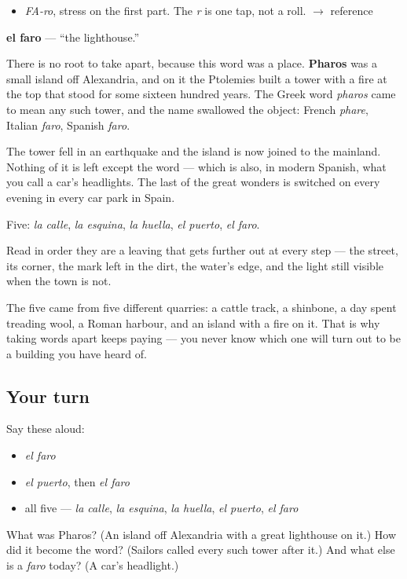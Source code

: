 \begin{sounds}
\begin{itemize}
\raggedright
  \item \emph{FA-ro}, stress on the first part. The \emph{r} is one tap, not a roll. $\to$ reference
\end{itemize}
\end{sounds}

\begin{cousinweb}
\textbf{el faro} — \textquotedblleft{}the lighthouse.\textquotedblright{}

There is no root to take apart, because this word was a place. \textbf{Pharos} was a small island off Alexandria, and on it the Ptolemies built a tower with a fire at the top that stood for some sixteen hundred years. The Greek word \emph{pharos} came to mean any such tower, and the name swallowed the object: French \emph{phare}, Italian \emph{faro}, Spanish \emph{faro}.

The tower fell in an earthquake and the island is now joined to the mainland. Nothing of it is left except the word — which is also, in modern Spanish, what you call a car's headlights. The last of the great wonders is switched on every evening in every car park in Spain.
\end{cousinweb}

\begin{grammarlens}[title={What you've built}]
Five: \emph{la calle}, \emph{la esquina}, \emph{la huella}, \emph{el puerto}, \emph{el faro}.

Read in order they are a leaving that gets further out at every step — the street, its corner, the mark left in the dirt, the water's edge, and the light still visible when the town is not.

The five came from five different quarries: a cattle track, a shinbone, a day spent treading wool, a Roman harbour, and an island with a fire on it. That is why taking words apart keeps paying — you never know which one will turn out to be a building you have heard of.
\end{grammarlens}

\subsection*{Your turn}
Say these aloud:

\begin{itemize}
\raggedright
  \item \emph{el faro}
  \item \emph{el puerto}, then \emph{el faro}
  \item all five — \emph{la calle}, \emph{la esquina}, \emph{la huella}, \emph{el puerto}, \emph{el faro}
\end{itemize}

\begin{tcolorbox}[breakable,colback=teal!4,colframe=teal!35!black,title={Before you move on}]
What was Pharos? (An island off Alexandria with a great lighthouse on it.) How did it become the word? (Sailors called every such tower after it.) And what else is a \emph{faro} today? (A car's headlight.)
\end{tcolorbox}
